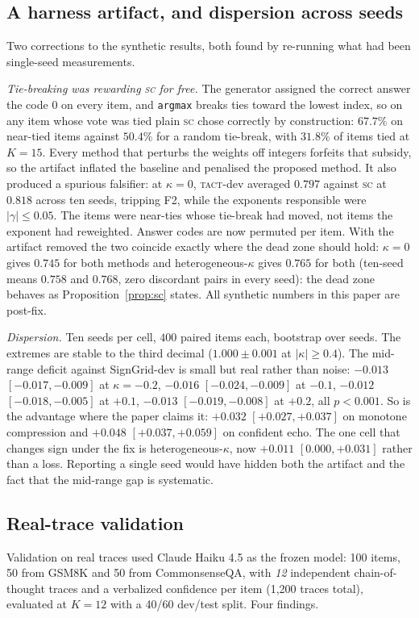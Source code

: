 \documentclass[twoside,11pt]{article}
\newcommand{\SC}{\textsc{sc}}
\newcommand{\TACT}{\textsc{tact}}
\begin{document}
\subsection{A harness artifact, and dispersion across seeds}\label{sec:seeds}
Two corrections to the synthetic results, both found by re-running what had
been single-seed measurements.

\emph{Tie-breaking was rewarding \SC{} for free.} The generator assigned the
correct answer the code $0$ on every item, and \texttt{argmax} breaks ties
toward the lowest index, so on any item whose vote was tied plain \SC{} chose
correctly by construction: $67.7\%$ on near-tied items against $50.4\%$ for a
random tie-break, with $31.8\%$ of items tied at $K{=}15$. Every method that
perturbs the weights off integers forfeits that subsidy, so the artifact
inflated the baseline and penalised the proposed method. It also produced a
spurious falsifier: at $\kappa=0$, \TACT-dev averaged $0.797$ against \SC{} at
$0.818$ across ten seeds, tripping F2, while the exponents responsible were
$|\gamma|\le0.05$. The items were near-ties whose tie-break had moved, not
items the exponent had reweighted. Answer codes are now permuted per item.
With the artifact removed the two coincide exactly where the dead zone
should hold: $\kappa=0$ gives $0.745$ for both methods and
heterogeneous-$\kappa$ gives $0.765$ for both (ten-seed means $0.758$ and
$0.768$, zero discordant pairs in every seed): the dead zone behaves as
Proposition~\ref{prop:sc} states. All synthetic numbers in this paper are
post-fix.

\emph{Dispersion.} Ten seeds per cell, $400$ paired items each, bootstrap over
seeds. The extremes are stable to the third decimal ($1.000\pm0.001$ at
$|\kappa|\ge0.4$). The mid-range deficit against SignGrid-dev is small but
real rather than noise: $-0.013$ $[-0.017,-0.009]$ at $\kappa=-0.2$, $-0.016$
$[-0.024,-0.009]$ at $-0.1$, $-0.012$ $[-0.018,-0.005]$ at $+0.1$, $-0.013$
$[-0.019,-0.008]$ at $+0.2$, all $p<0.001$. So is the advantage where the
paper claims it: $+0.032$ $[+0.027,+0.037]$ on monotone compression and
$+0.048$ $[+0.037,+0.059]$ on confident echo. The one cell that changes sign
under the fix is heterogeneous-$\kappa$, now $+0.011$ $[0.000,+0.031]$ rather
than a loss. Reporting a single seed would have hidden both the artifact and
the fact that the mid-range gap is systematic.


\subsection{Real-trace validation}\label{sec:real}
Validation on real traces used Claude Haiku 4.5 as the frozen model: 100 items, 50 from
GSM8K \citep{gsm8k2021} and 50 from CommonsenseQA, with \emph{12} independent
chain-of-thought traces and a verbalized confidence per item (1{,}200 traces
total), evaluated at $K{=}12$ with a 40/60 dev/test split. Four findings.
\end{document}
